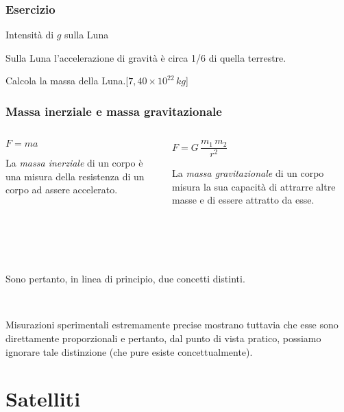 \documentclass[]{beamer}
\theoremstyle{plain}
\begin{document}
\begin{frame}
\frametitle{Esercizio}
\begin{exampleblock}{Intensità di $ g $ sulla Luna}
  \small{Sulla Luna l'accelerazione di gravità è circa 1/6 di quella terrestre.

  Calcola la massa della Luna.\hspace*{\fill}[$ 7,40 \times 10^{22} \, kg $]}
\end{exampleblock}
\end{frame}




\begin{frame}
\frametitle{Massa inerziale e massa gravitazionale}
\begin{columns}
\begin{column}{0.45\textwidth}
\begin{center}
$ F = ma $
\end{center}
La \emph{massa inerziale} di un corpo è una misura della resistenza di un corpo ad assere accelerato.\pause
\end{column}
\begin{column}{0.45\textwidth}
\begin{center}
$ F = G \,  \dfrac{m_1 \, m_2}{r^2} $
\end{center}
La \emph{massa gravitazionale} di un corpo misura la sua capacità di attrarre altre masse e di essere attratto da esse.\pause
\end{column}
\end{columns}

~

~

Sono pertanto, in linea di principio, \alert{due concetti distinti}.\pause

~

Misurazioni sperimentali estremamente precise mostrano tuttavia che esse sono \alert{direttamente proporzionali} e pertanto, dal punto di vista pratico, possiamo ignorare tale distinzione (che pure esiste concettualmente). 
\end{frame}


\section{Satelliti}
\end{document}
